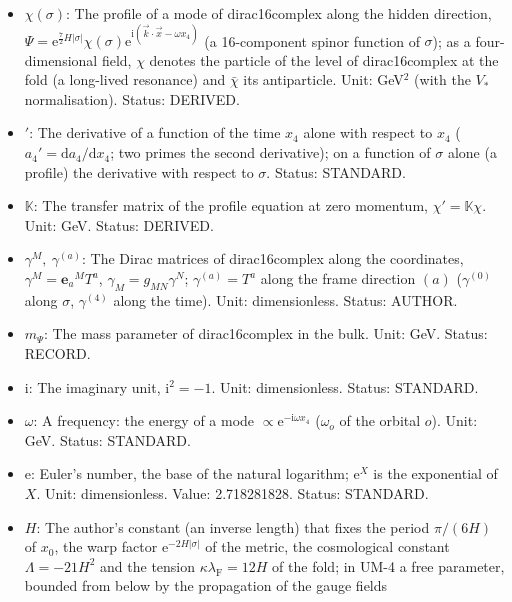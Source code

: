 \documentclass[
  10pt,
]{article}
\providecommand{\tightlist}{%
  \setlength{\itemsep}{0pt}\setlength{\parskip}{0pt}}
\begin{document}
\begin{itemize}
\tightlist
\item
  \(\chi(\sigma)\): The profile of a mode of dirac16complex along the
  hidden direction,
  \(\Psi = \mathrm{e}^{\frac72H\lvert\sigma\rvert}\chi(\sigma)\mathrm{e}^{\mathrm{i}(\vec k\cdot\vec x - \omega x_4)}\)
  (a 16-component spinor function of \(\sigma\)); as a four-dimensional
  field, \(\chi\) denotes the particle of the level of dirac16complex at
  the fold (a long-lived resonance) and \(\bar\chi\) its antiparticle.
  Unit: GeV\(^{2}\) (with the \(V_*\) normalisation). Status: DERIVED.
\item
  \({}'\): The derivative of a function of the time \(x_4\) alone with
  respect to \(x_4\) (\(a_4' = \mathrm{d}a_4/\mathrm{d}x_4\); two primes
  the second derivative); on a function of \(\sigma\) alone (a profile)
  the derivative with respect to \(\sigma\). Status: STANDARD.
\item
  \(\mathbb{K}\): The transfer matrix of the profile equation at zero
  momentum, \(\chi' = \mathbb{K}\chi\). Unit: GeV. Status: DERIVED.
\item
  \(\gamma^M,\ \gamma^{(a)}\): The Dirac matrices of dirac16complex
  along the coordinates, \(\gamma^M = \mathbf{e}_a{}^MT^a\),
  \(\gamma_M = g_{MN}\gamma^N\); \(\gamma^{(a)} = T^a\) along the frame
  direction \((a)\) (\(\gamma^{(0)}\) along \(\sigma\), \(\gamma^{(4)}\)
  along the time). Unit: dimensionless. Status: AUTHOR.
\item
  \(m_\Psi\): The mass parameter of dirac16complex in the bulk. Unit:
  GeV. Status: RECORD.
\item
  \(\mathrm{i}\): The imaginary unit, \(\mathrm{i}^2 = -1\). Unit:
  dimensionless. Status: STANDARD.
\item
  \(\omega\): A frequency: the energy of a mode
  \(\propto \mathrm{e}^{-\mathrm{i}\omega x_4}\) (\(\omega_o\) of the
  orbital \(o\)). Unit: GeV. Status: STANDARD.
\item
  \(\mathrm{e}\): Euler's number, the base of the natural logarithm;
  \(\mathrm{e}^{X}\) is the exponential of \(X\). Unit: dimensionless.
  Value: 2.718281828. Status: STANDARD.
\item
  \(H\): The author's constant (an inverse length) that fixes the period
  \(\pi/(6H)\) of \(x_0\), the warp factor
  \(\mathrm{e}^{-2H\lvert\sigma\rvert}\) of the metric, the cosmological
  constant \(\Lambda = -21H^2\) and the tension
  \(\kappa\lambda_{\mathrm{F}} = 12H\) of the fold; in UM-4 a free
  parameter, bounded from below by the propagation of the gauge fields

\end{itemize}
\end{document}
